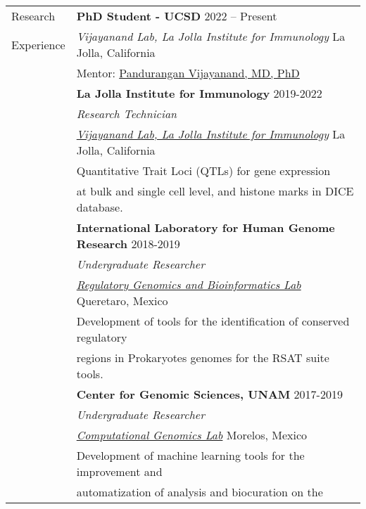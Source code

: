 \documentclass[letterpaper, 11pt]{article}
\begin{document}
\begin{longtable}{@{}p{1.1in}p{6.05in}}

{\sc Research} &
\textbf{PhD Student - UCSD} \hfill 2022 -- Present   \\
{\sc Experience} & \textit{Vijayanand Lab, La Jolla Institute for Immunology} \hfill La Jolla, California \\
& Mentor: \href{https://www.lji.org/labs/vijayanand/}{Pandurangan Vijayanand, MD, PhD} \\
&\textbf{La Jolla Institute for Immunology} \hfill 2019-2022\\
& \textit{Research Technician}\\
& \href{https://www.lji.org/labs/vijayanand/}{\textit{Vijayanand Lab, La Jolla Institute for Immunology}} \hfill La 
Jolla, California \\
& Quantitative Trait Loci (QTLs) for gene expression \\ & at bulk and single cell level, and histone marks in DICE database.  \\
&\textbf{International Laboratory for Human Genome Research} \hfill 2018-2019\\
& \textit{Undergraduate Researcher}\\
& \href{https://liigh.unam.mx/amedina/}{\textit{Regulatory Genomics and Bioinformatics Lab}} \hfill Queretaro, Mexico \\
& Development of tools for the identification of conserved regulatory \\ & regions in Prokaryotes genomes for the RSAT 
suite tools. \\
&\textbf{Center for Genomic Sciences, UNAM} \hfill 2017-2019\\
& \textit{Undergraduate Researcher}\\
& \href{https://www.ccg.unam.mx/en/computational-genomics/}{\textit{Computational Genomics Lab}} \hfill Morelos, Mexico 
\\
& Development of machine learning tools for the improvement and \\ & automatization of analysis and biocuration on the 

\end{longtable}
\end{document}
